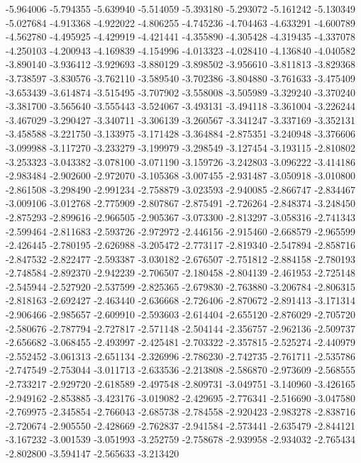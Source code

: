 -5.964006
-5.794355
-5.639940
-5.514059
-5.393180
-5.293072
-5.161242
-5.130349
-5.027684
-4.913368
-4.922022
-4.806255
-4.745236
-4.704463
-4.633291
-4.600789
-4.562780
-4.495925
-4.429919
-4.421441
-4.355890
-4.305428
-4.319435
-4.337078
-4.250103
-4.200943
-4.169839
-4.154996
-4.013323
-4.028410
-4.136840
-4.040582
-3.890140
-3.936412
-3.929693
-3.880129
-3.898502
-3.956610
-3.811813
-3.829368
-3.738597
-3.830576
-3.762110
-3.589540
-3.702386
-3.804880
-3.761633
-3.475409
-3.653439
-3.614874
-3.515495
-3.707902
-3.558008
-3.505989
-3.329240
-3.370240
-3.381700
-3.565640
-3.555443
-3.524067
-3.493131
-3.494118
-3.361004
-3.226244
-3.467029
-3.290427
-3.340711
-3.306139
-3.260567
-3.341247
-3.337169
-3.352131
-3.458588
-3.221750
-3.133975
-3.171428
-3.364884
-2.875351
-3.240948
-3.376606
-3.099988
-3.117270
-3.233279
-3.199979
-3.298549
-3.127454
-3.193115
-2.810802
-3.253323
-3.043382
-3.078100
-3.071190
-3.159726
-3.242803
-3.096222
-3.414186
-2.983484
-2.902600
-2.972070
-3.105368
-3.007455
-2.931487
-3.050918
-3.010800
-2.861508
-3.298490
-2.991234
-2.758879
-3.023593
-2.940085
-2.866747
-2.834467
-3.009106
-3.012768
-2.775909
-2.807867
-2.875491
-2.726264
-2.848374
-3.248450
-2.875293
-2.899616
-2.966505
-2.905367
-3.073300
-2.813297
-3.058316
-2.741343
-2.599464
-2.811683
-2.593726
-2.972972
-2.446156
-2.915460
-2.668579
-2.965599
-2.426445
-2.780195
-2.626988
-3.205472
-2.773117
-2.819340
-2.547894
-2.858716
-2.847532
-2.822477
-2.593387
-3.030182
-2.676507
-2.751812
-2.884158
-2.780193
-2.748584
-2.892370
-2.942239
-2.706507
-2.180458
-2.804139
-2.461953
-2.725148
-2.545944
-2.527920
-2.537599
-2.825365
-2.679830
-2.763880
-3.206784
-2.806315
-2.818163
-2.692427
-2.463440
-2.636668
-2.726406
-2.870672
-2.891413
-3.171314
-2.906466
-2.985657
-2.609910
-2.593603
-2.614404
-2.655120
-2.876029
-2.705720
-2.580676
-2.787794
-2.727817
-2.571148
-2.504144
-2.356757
-2.962136
-2.509737
-2.656682
-3.068455
-2.493997
-2.425481
-2.703322
-2.357815
-2.525274
-2.440979
-2.552452
-3.061313
-2.651134
-2.326996
-2.786230
-2.742735
-2.761711
-2.535786
-2.747549
-2.753044
-3.011713
-2.633536
-2.213808
-2.586870
-2.973609
-2.568555
-2.733217
-2.929720
-2.618589
-2.497548
-2.809731
-3.049751
-3.140960
-3.426165
-2.949162
-2.853885
-3.423176
-3.019082
-2.429695
-2.776341
-2.516690
-3.047580
-2.769975
-2.345854
-2.766043
-2.685738
-2.784558
-2.920423
-2.983278
-2.838716
-2.720674
-2.905550
-2.428669
-2.762837
-2.941584
-2.573441
-2.635479
-2.844121
-3.167232
-3.001539
-3.051993
-3.252759
-2.758678
-2.939958
-2.934032
-2.765434
-2.802800
-3.594147
-2.565633
-3.213420
